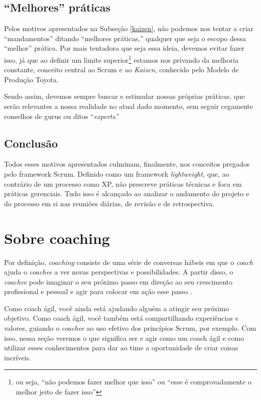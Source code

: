 \documentclass{iiufrgs}
\begin{document}
\subsection{\enquote{Melhores} práticas}\label{melhores}

Pelos motivos apresentados na Subseção \ref{kaizen}, não podemos nos tentar a criar \enquote{mandamentos} ditando \enquote{melhores práticas,} qualquer que seja o escopo dessa \enquote{melhor} prática. Por mais tentadora que seja essa ideia, devemos evitar fazer isso, já que ao definir um limite superior\footnote{ou seja, \enquote{não podemos fazer melhor que isso} ou \enquote{esse é comprovadamente o melhor jeito de fazer isso}} estamos nos privando da melhoria constante, conceito central ao Scrum e ao \textit{Kaizen}, conhecido pelo Modelo de Produção Toyota.

Sendo assim, devemos sempre buscar e estimular nossas próprias práticas, que serão relevantes a nossa realidade no atual dado momento, sem seguir cegamente conselhos de gurus ou ditos \enquote{\textit{experts}.} 

\subsection{Conclusão}

Todos esses motivos apresentados culminam, finalmente, nos conceitos pregados pelo framework Scrum. Definido como um framework \textit{lightweight}, que, ao contrário de um processo como XP, não prescreve práticas técnicas e foca em práticas gerenciais. Tudo isso é alcançado ao analizar o andamento do projeto e do processo em si nas reuniões diárias, de revisão e de retrospectiva.



\section{Sobre coaching}\label{coaching}

Por definição, \textit{coaching} consiste de uma série de conversas hábeis em que o \textit{coach} ajuda o \textit{coachee} a ver novas perspectivas e possibilidades. A partir disso, o \textit{coachee} pode imaginar o seu próximo passo em direção ao seu crescimento profissional e pessoal e agir para colocar em ação esse passo \cite{Adkins2010Coaching}.

Como coach ágil, você ainda está ajudando alguém a atingir seu próximo objetivo. Como coach ágil, você também está compartilhando experiências e valores, guiando o \textit{coachee} ao uso efetivo dos princípios Scrum, por exemplo. Com isso, nessa seção veremos o que significa ser e agir como um coach ágil e como utilizar esses conhecimentos para dar ao time a oportunidade de criar coisas incríveis.
\end{document}
